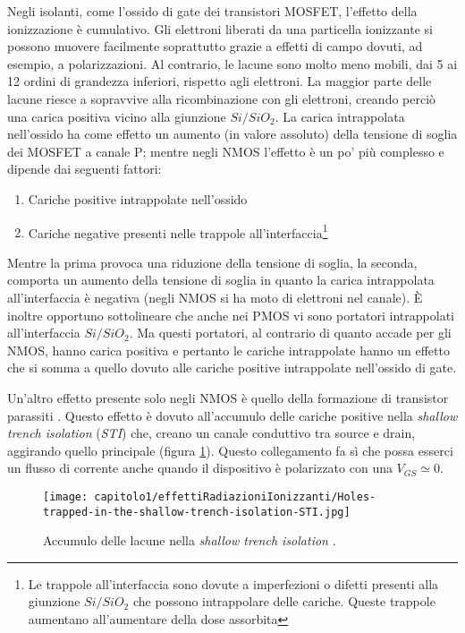 Negli isolanti, come l'ossido di gate dei transistori MOSFET, l'effetto della ionizzazione è cumulativo. Gli elettroni liberati da una particella ionizzante si possono muovere facilmente soprattutto grazie a effetti di campo dovuti, ad esempio, a polarizzazioni.
Al contrario, le lacune sono molto meno mobili, dai 5 ai 12 ordini di grandezza inferiori, rispetto agli elettroni. La maggior parte delle lacune riesce a sopravvive alla ricombinazione con gli elettroni, creando perciò una carica positiva vicino alla giunzione $Si/SiO_2$.
La carica intrappolata nell'ossido ha come effetto un aumento (in valore assoluto) della tensione di soglia dei MOSFET a canale P; mentre negli NMOS l'effetto è un po' più complesso e dipende dai seguenti fattori:
\begin{enumerate}
	\item Cariche positive intrappolate nell'ossido
	\item Cariche negative presenti nelle trappole all'interfaccia\footnote{Le trappole all'interfaccia sono dovute a imperfezioni o difetti presenti alla giunzione $Si/SiO_2$ che possono intrappolare delle cariche. Queste trappole aumentano all'aumentare della dose assorbita}
\end{enumerate}
Mentre la prima provoca una riduzione della tensione di soglia, la seconda, comporta un aumento della tensione di soglia in quanto la carica intrappolata all'interfaccia è negativa (negli NMOS si ha moto di elettroni nel canale). 
È inoltre opportuno sottolineare che anche nei PMOS vi sono portatori intrappolati all'interfaccia $Si/SiO_2$. Ma questi portatori, al contrario di quanto accade per gli NMOS, hanno carica positiva e pertanto le cariche intrappolate hanno un effetto che si somma a quello dovuto alle cariche positive intrappolate nell'ossido di gate.  

\vspace{0.5cm}

Un'altro effetto presente solo negli NMOS è quello della formazione di transistor parassiti \cite{effetti_radiazioni:CMOS_IC_radiation_hardening_by_design}. Questo effetto è dovuto all'accumulo delle cariche positive nella \textit{shallow trench isolation} (\textit{STI}) che, creano un canale conduttivo tra source e drain, aggirando quello principale (figura \ref{fig:accumulo_lacune_STI}). Questo collegamento fa sì che possa esserci un flusso di corrente anche quando il dispositivo è polarizzato con una $V_{GS} \simeq 0$.

\begin{figure}[ht]
	\centering

	\texttt{[image: capitolo1/effettiRadiazioniIonizzanti/Holes-trapped-in-the-shallow-trench-isolation-STI.jpg]}

	\caption[Lacune nella \textit{STI}]{Accumulo delle lacune nella \textit{shallow trench isolation} \cite{effetti_radiazioni:CMOS_IC_radiation_hardening_by_design}.}
	\label{fig:accumulo_lacune_STI}

\end{figure}

